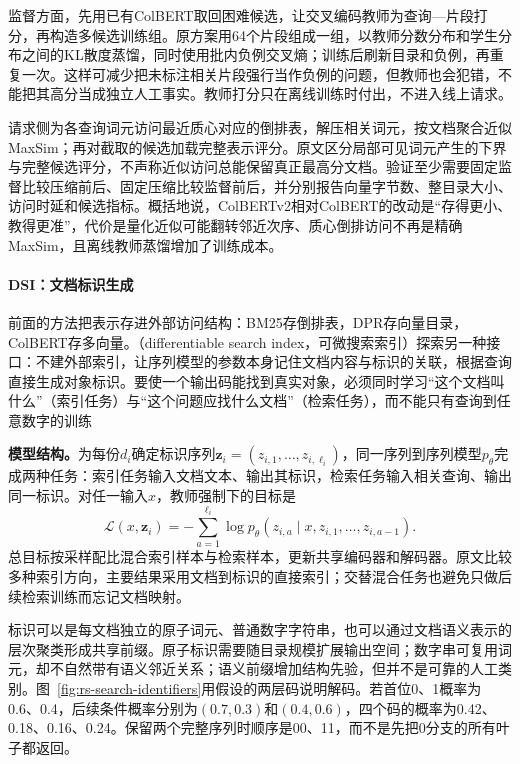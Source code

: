 监督方面，先用已有ColBERT取回困难候选，让交叉编码教师为查询—片段打分，再构造多候选训练组。原方案用64个片段组成一组，以教师分数分布和学生分布之间的KL散度蒸馏，同时使用批内负例交叉熵；训练后刷新目录和负例，再重复一次。这样可减少把未标注相关片段强行当作负例的问题，但教师也会犯错，不能把其高分当成独立人工事实。教师打分只在离线训练时付出，不进入线上请求。

请求侧为各查询词元访问最近质心对应的倒排表，解压相关词元，按文档聚合近似MaxSim；再对截取的候选加载完整表示评分。原文区分局部可见词元产生的下界与完整候选评分，不声称近似访问总能保留真正最高分文档。验证至少需要固定监督比较压缩前后、固定压缩比较监督前后，并分别报告向量字节数、整目录大小、访问时延和候选指标。概括地说，ColBERTv2相对ColBERT的改动是“存得更小、教得更准”，代价是量化近似可能翻转邻近次序、质心倒排访问不再是精确MaxSim，且离线教师蒸馏增加了训练成本。

\Needspace{135mm}
\paragraph{DSI：文档标识生成}
\label{sec:rs-search-dsi}

前面的方法把表示存进外部访问结构：BM25存倒排表，DPR存向量目录，ColBERT存多向量。（differentiable search index，可微搜索索引）探索另一种接口：不建外部索引，让序列模型的参数本身记住文档内容与标识的关联，根据查询直接生成对象标识。要使一个输出码能找到真实对象，必须同时学习“这个文档叫什么”（索引任务）与“这个问题应找什么文档”（检索任务），而不能只有查询到任意数字的训练

\textbf{模型结构。}为每份$d_i$确定标识序列$\bm z_i=(z_{i,1},\ldots,z_{i,\ell_i})$，同一序列到序列模型$p_\theta$完成两种任务：索引任务输入文档文本、输出其标识，检索任务输入相关查询、输出同一标识。对任一输入$x$，教师强制下的目标是
\begin{equation}
 \mathcal L(x,\bm z_i)=-\sum_{a=1}^{\ell_i}
     \log p_\theta(z_{i,a}\mid x,z_{i,1},\ldots,z_{i,a-1}).
 \label{eq:rs-search-dsi-objective}
\end{equation}
总目标按采样配比混合索引样本与检索样本，更新共享编码器和解码器。原文比较多种索引方向，主要结果采用文档到标识的直接索引；交替混合任务也避免只做后续检索训练而忘记文档映射。

标识可以是每文档独立的原子词元、普通数字字符串，也可以通过文档语义表示的层次聚类形成共享前缀。原子标识需要随目录规模扩展输出空间；数字串可复用词元，却不自然带有语义邻近关系；语义前缀增加结构先验，但并不是可靠的人工类别。图~\ref{fig:rs-search-identifiers}用假设的两层码说明解码。若首位0、1概率为0.6、0.4，后续条件概率分别为$(0.7,0.3)$和$(0.4,0.6)$，四个码的概率为0.42、0.18、0.16、0.24。保留两个完整序列时顺序是00、11，而不是先把0分支的所有叶子都返回。

